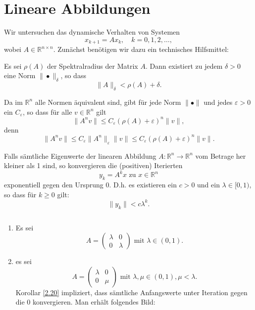 \documentclass[main.tex]{subfiles}
\begin{document}
\section{Lineare Abbildungen}
\label{section:2.5}
Wir untersuchen das dynamische Verhalten von Systemen
\begin{equation}
\label{eqn:2.8}
x_{k+1} = Ax_k, \quad k=0,1,2,…,
\end{equation}
wobei $A \in ℝ^{n\times n}$. 
Zunächst benötigen wir dazu ein technisches Hilfsmittel:

\setcounter{satz}{17}
\begin{satz}\label{2.18}
Es sei $ρ(A)$ der Spektralradius der Matrix $A$. Dann existiert zu jedem $δ>0$ eine Norm $\| • \|_δ$, so dass 
$$\|A\|_δ < ρ(A) + δ.$$
\end{satz}
\begin{bem}\label{2.19}
Da im $ℝ^n$ alle Normen äquivalent sind, gibt für jede Norm $\|•\|$ und jedes $ε>0$ ein $C_ε$, so dass für alle $v\in ℝ^n$ gilt
\begin{equation}
\label{eqn:2.19}
\| A^n v \| \le C_ε \left( ρ(A) + ε \right)^n \| v \|,
\end{equation}
denn 
$$\| A^n v\| \le C_ε\| A^n \|_ε \| v \| \le C_ε \left( ρ(A) + ε \right)^n \| v\|.$$
\end{bem}

\begin{korollar}\label{2.20}
Falls sämtliche Eigenwerte der linearen Abbildung $A\colon ℝ^n\to ℝ^n$ vom Betrage her kleiner als 1 sind, so konvergieren die (positiven) Iterierten 
$$y_k = A^k x \text{ zu $x\in ℝ^n$}$$
exponentiell gegen den Ursprung 0. 
D.h. es existieren ein $c>0$ und ein $λ\in [0,1)$, so dass für $k\ge 0$ gilt:
$$\|y_k \|< cλ^k.$$
\end{korollar}

\begin{bsp}\label{2.21}
$ $\\[-1em]
\begin{enumerate}
[label=(\alph*)]
\item Es sei 
$$A = \begin{pmatrix}
λ & 0\\ 0& λ
\end{pmatrix} \text{ mit $λ\in (0,1)$.}$$
\item es sei 
$$A = \begin{pmatrix}
λ & 0
\\0 & μ
\end{pmatrix}\text{ mit $λ,μ\in (0,1), μ< λ$.}$$
Korollar \ref{2.20} impliziert, dass sämtliche Anfangswerte unter Iteration gegen die $0$ konvergieren. Man erhält folgendes Bild:

\begin{center}

\end{center}
\end{enumerate}
\end{bsp}
\end{document}
